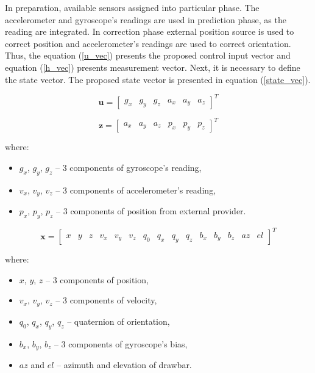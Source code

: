 In preparation, available sensors assigned into particular phase. The accelerometer and gyroscope's readings are used in prediction phase, as the reading are integrated. In correction phase external position source is used to correct position and accelerometer's readings are used to correct orientation.  Thus, the equation (\ref{u_vec}) presents the proposed control input vector and equation (\ref{h_vec}) presents measurement vector. Next, it is necessary to define the state vector. The proposed state vector is presented in equation (\ref{state_vec}).

\begin{equation}
	\bm{u} = \begin{bmatrix}
		g_x & g_y & g_z & a_x & a_y & a_z
	\end{bmatrix}^T
	\label{u_vec}
\end{equation}

\begin{equation}
	\bm{z} = \begin{bmatrix}
		a_x & a_y & a_z & p_x & p_y & p_z
	\end{bmatrix}^T
	\label{h_vec}
\end{equation}

where:
\begin{itemize}
	\item $g_x$, $g_y$, $g_z$ -- 3 components of gyroscope's reading,
	\item $v_x$, $v_y$, $v_z$ -- 3 components of accelerometer's reading,
	\item $p_x$, $p_y$, $p_z$ -- 3 components of position from external provider.
\end{itemize}

\begin{equation}
	\bm{x} = \begin{bmatrix}
	x & y & z & v_x & v_y & v_z & q_0 & q_x & q_y & q_z & b_x & b_y & b_z & az & el
	\end{bmatrix}^T
	\label{state_vec}
\end{equation}

where:
\begin{itemize}
	\item $x$, $y$, $z$ -- 3 components of position,
	\item $v_x$, $v_y$, $v_z$ -- 3 components of velocity,
	\item $q_0$, $q_x$, $q_y$, $q_z$ -- quaternion of orientation,
	\item $b_x$, $b_y$, $b_z$ -- 3 components of gyroscope's bias,
	\item $az$ and $el$ -- azimuth and elevation of drawbar.
\end{itemize}

